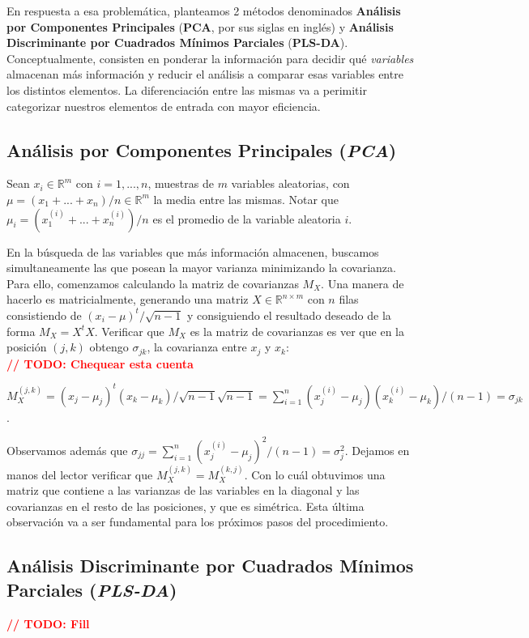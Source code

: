 En respuesta a esa problem\'atica, planteamos 2 m\'etodos denominados \textbf{An\'alisis por Componentes Principales} (\textbf{PCA}, por sus siglas en ingl\'es) y \textbf{An\'alisis Discriminante por Cuadrados M\'inimos Parciales} (\textbf{PLS-DA}). Conceptualmente, consisten en ponderar la informaci\'on para decidir qu\'e \textit{variables} almacenan m\'as informaci\'on y reducir el an\'alisis a comparar esas variables entre los distintos elementos. La diferenciaci\'on entre las mismas va a perimitir categorizar nuestros elementos de entrada con mayor eficiencia.

\subsection{An\'alisis por Componentes Principales (\textit{PCA})}

Sean $x_{i} \in \mathbb{R}^{m}$ con $i = 1, ..., n$, muestras de $m$ variables aleatorias, con $\mu = (x_{1} + ... + x_{n}) / n \in \mathbb{R}^{m}$ la media entre las mismas. Notar que $\mu_{i} = (x_{1}^{(i)} + ... + x_{n}^{(i)}) / n$ es el promedio de la variable aleatoria $i$.

En la b\'usqueda de las variables que m\'as informaci\'on almacenen, buscamos simultaneamente las que posean la mayor varianza minimizando la covarianza. Para ello, comenzamos calculando la matriz de covarianzas $M_{X}$. Una manera de hacerlo es matricialmente, generando una matriz $X \in \mathbb{R}^{n \times m}$ con $n$ filas consistiendo de $(x_{i} - \mu)^t / \sqrt{n - 1}$ y consiguiendo el resultado deseado de la forma $M_{X} = X^{t}X$. Verificar que $M_{X}$ es la matriz de covarianzas es ver que en la posici\'on $(j, k)$ obtengo $\sigma_{jk}$, la covarianza entre $x_{j}$ y $x_{k}$: \\

\textbf{\textcolor{red}{// TODO: Chequear esta cuenta}}

$M_{X}^{(j,k)} = (x_{j} - \mu_{j})^t(x_{k} - \mu_{k}) / \sqrt{n - 1}\sqrt{n - 1} = \sum\limits_{i = 1}^{n}(x_{j}^{(i)} - \mu_{j})(x_{k}^{(i)} - \mu_{k}) / (n - 1) = \sigma_{jk}$.

Observamos adem\'as que $\sigma_{jj} = \sum\limits_{i = 1}^{n}(x_{j}^{(i)} - \mu_{j})^{2} / (n - 1) = \sigma_{j}^{2}$. Dejamos en manos del lector verificar que $M_{X}^{(j,k)} = M_{X}^{(k,j)}$. Con lo cu\'al obtuvimos una matriz que contiene a las varianzas de las variables en la diagonal y las covarianzas en el resto de las posiciones, y que es sim\'etrica. Esta \'ultima observaci\'on va a ser fundamental para los pr\'oximos pasos del procedimiento.

\subsection{An\'alisis Discriminante por Cuadrados M\'inimos Parciales (\textit{PLS-DA})}

\textbf{\textcolor{red}{// TODO: Fill}}